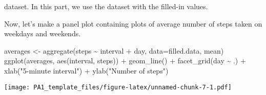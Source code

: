 \documentclass[
]{article}
\newenvironment{Shaded}{\begin{snugshade}}{\end{snugshade}}
\newcommand{\AttributeTok}[1]{\textcolor[rgb]{0.77,0.63,0.00}{#1}}
\newcommand{\ControlFlowTok}[1]{\textcolor[rgb]{0.13,0.29,0.53}{\textbf{#1}}}
\newcommand{\FunctionTok}[1]{\textcolor[rgb]{0.00,0.00,0.00}{#1}}
\newcommand{\NormalTok}[1]{#1}
\newcommand{\OtherTok}[1]{\textcolor[rgb]{0.56,0.35,0.01}{#1}}
\newcommand{\SpecialCharTok}[1]{\textcolor[rgb]{0.00,0.00,0.00}{#1}}
\newcommand{\StringTok}[1]{\textcolor[rgb]{0.31,0.60,0.02}{#1}}
\begin{document}
dataset. In this part, we use the dataset with the filled-in values.
\begin{Shaded}
\end{Shaded}
Now, let's make a panel plot containing plots of average number of steps
taken on weekdays and weekends.
\begin{Shaded}
\begin{Highlighting}[]
\NormalTok{averages }\OtherTok{\textless{}{-}} \FunctionTok{aggregate}\NormalTok{(steps }\SpecialCharTok{\textasciitilde{}}\NormalTok{ interval }\SpecialCharTok{+}\NormalTok{ day, }\AttributeTok{data=}\NormalTok{filled.data, mean)}
\FunctionTok{ggplot}\NormalTok{(averages, }\FunctionTok{aes}\NormalTok{(interval, steps)) }\SpecialCharTok{+} \FunctionTok{geom\_line}\NormalTok{() }\SpecialCharTok{+} \FunctionTok{facet\_grid}\NormalTok{(day }\SpecialCharTok{\textasciitilde{}}\NormalTok{ .) }\SpecialCharTok{+}
    \FunctionTok{xlab}\NormalTok{(}\StringTok{"5{-}minute interval"}\NormalTok{) }\SpecialCharTok{+} \FunctionTok{ylab}\NormalTok{(}\StringTok{"Number of steps"}\NormalTok{)}
\end{Highlighting}
\end{Shaded}
\texttt{[image: PA1\_template\_files/figure-latex/unnamed-chunk-7-1.pdf]}
\end{document}
